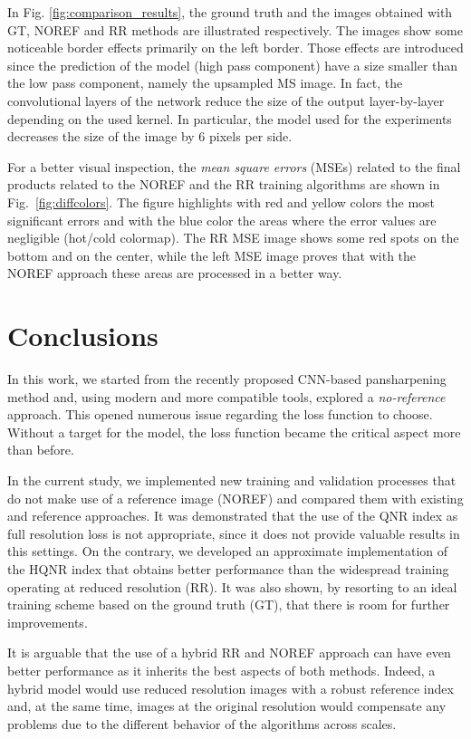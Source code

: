 \documentclass[12pt]{report}
\begin{document}
In Fig. \ref{fig:comparison_results}, the ground truth and the images obtained with GT, NOREF and RR methods are illustrated respectively.
The images show some noticeable border effects primarily on the left border. Those effects are introduced since the prediction of the model (high pass component) have a size smaller than the low pass component, namely the upsampled MS image. 
In fact, the convolutional layers of the network reduce the size of the output layer-by-layer depending on the used kernel. In particular, the model used for the experiments decreases the size of the image by 6 pixels per side.



For a better visual inspection, the \textit{mean square errors} (MSEs) related to the final products related to the NOREF and the RR training algorithms are shown in Fig.~\ref{fig:diffcolors}.
The figure highlights with red and yellow colors the most significant errors and with the blue color the areas where the error values are negligible (hot/cold colormap).
The RR MSE image shows some red spots on the bottom and on the center, while the left MSE image proves that with the NOREF approach these areas are processed in a better way.


\chapter*{Conclusions}
In this work, we started from the recently proposed \cite{pnn2} CNN-based pansharpening method and, using modern and more compatible tools, explored a \textit{no-reference} approach.
This opened numerous issue regarding the loss function to choose.
Without a target for the model, the loss function became the critical aspect more than before.

In the current study, we implemented new training and validation processes that do not make use of a reference image (NOREF) and compared them with existing and reference approaches. 
It was demonstrated that the use of the QNR index as full resolution loss is not appropriate, since it does not provide valuable results in this settings. On the contrary, we developed an approximate implementation of the HQNR index that obtains better performance than the widespread training operating at reduced resolution (RR). It was also shown, by resorting to an ideal training scheme based on the ground truth (GT), that there is room for further improvements. 

It is arguable that the use of a hybrid RR and NOREF approach can have even better performance as it inherits the best aspects of both methods.
Indeed, a hybrid model would use reduced resolution images with a robust reference index
and, at the same time, images at the original resolution would compensate any problems due to the different behavior of the algorithms across scales.
\end{document}
